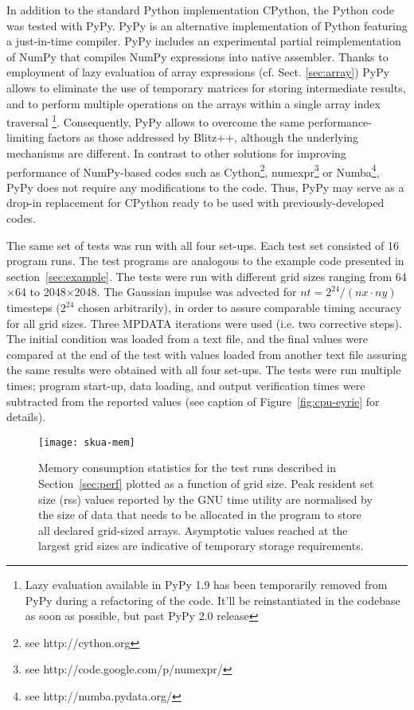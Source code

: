 \documentclass[review,peprint,10pt,5p,times]{elsarticle}
\newcommand{\url}[1]{{#1}}
\begin{document}
  In addition to the standard Python implementation CPython,
    the Python code was tested with PyPy.
  PyPy is an alternative implementation of Python featuring a just-in-time compiler. 
  PyPy includes an experimental partial reimplementation of NumPy that compiles NumPy expressions into native assembler.
  Thanks to employment of lazy evaluation of array expressions (cf. Sect. \ref{sec:array})
    PyPy allows to eliminate the use of temporary matrices for storing intermediate results,
    and to perform multiple operations on the arrays within a single array index traversal
    \footnote{Lazy evaluation available in PyPy 1.9 has been temporarily removed from PyPy during a refactoring of
      the code. It'll be reinstantiated in the codebase as soon as possible, but past PyPy 2.0 release}.
  Consequently, PyPy allows to overcome the same performance-limiting factors as those addressed by Blitz++, although 
    the underlying mechanisms are different.
  In contrast to other solutions for improving performance of NumPy-based codes such as
    Cython\footnote{see \url{http://cython.org}}, 
    numexpr\footnote{see \url{http://code.google.com/p/numexpr/}} or 
    Numba\footnote{see \url{http://numba.pydata.org/}}, 
    PyPy does not require any modifications to the code.
  Thus, PyPy may serve as a drop-in replacement for CPython ready to be used with 
    previously-developed codes.
  
  The same set of tests was run with all four set-ups.
  Each test set consisted of 16 program runs.
  The test programs are analogous to the example code presented in section~\ref{sec:example}.
  The tests were run with different grid sizes ranging from 64$\times$64 to 2048$\times$2048.
  The Gaussian impulse was advected for $nt=2^{24}/(nx\cdot ny)$ timesteps ($2^{24}$ chosen arbitrarily), 
    in order to assure comparable timing accuracy for all grid sizes.
  Three MPDATA iterations were used (i.e. two corrective steps).
  The initial condition was loaded from a text file, and the final values were compared at the end of the test
    with values loaded from another text file assuring the same results were obtained with all four set-ups.
  The tests were run multiple times; program start-up, data loading, and output verification times were
    subtracted from the reported values (see caption of Figure~\ref{fig:cpu-eyrie} for details).

  \begin{figure}[t]
    \center
    \texttt{[image: skua-mem]}
    \caption{\label{fig:mem}
      Memory consumption statistics for the test runs described in Section~\ref{sec:perf}
        plotted as a function of grid size.
      Peak resident set size (rss) values reported by the GNU time utility are normalised by the size of
        data that needs to be allocated in the program to store all declared grid-sized arrays.
      Asymptotic values reached at the largest grid sizes are indicative 
        of temporary storage requirements.
    }
  \end{figure}
\end{document}
